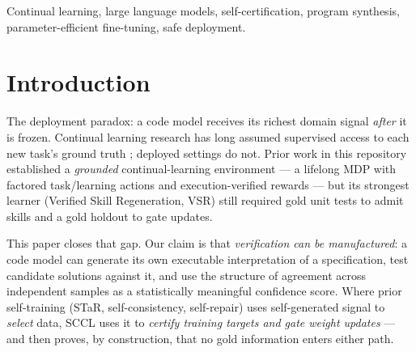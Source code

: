 \documentclass[10pt,conference]{IEEEtran}
\begin{document}
\begin{abstract}
a measured plasticity price at the gate; v3 moves neighborhood checking to \emph{admission}, rejecting instance-narrow solutions before any gradient is spent. All numbers derive from actually executed gradient updates and actually executed tests.
\end{abstract}

\begin{IEEEkeywords}
Continual learning, large language models, self-certification, program synthesis, parameter-efficient fine-tuning, safe deployment.
\end{IEEEkeywords}

\section{Introduction}
The deployment paradox: a code model receives its richest domain signal \emph{after} it is frozen. Continual learning research has long assumed supervised access to each new task's ground truth \cite{kirkpatrick2017ewc,gem,er}; deployed settings do not. Prior work in this repository established a \emph{grounded} continual-learning environment --- a lifelong MDP with factored task/learning actions and execution-verified rewards --- but its strongest learner (Verified Skill Regeneration, VSR) still required gold unit tests to admit skills and a gold holdout to gate updates.

This paper closes that gap. Our claim is that \emph{verification can be manufactured}: a code model can generate its own executable interpretation of a specification, test candidate solutions against it, and use the structure of agreement across independent samples as a statistically meaningful confidence score. Where prior self-training (STaR, self-consistency, self-repair) \cite{zelikman2022star,wang2022self,chen2024teaching,selfimprove} uses self-generated signal to \emph{select} data, SCCL uses it to \emph{certify training targets and gate weight updates} --- and then proves, by construction, that no gold information enters either path.
\end{document}
